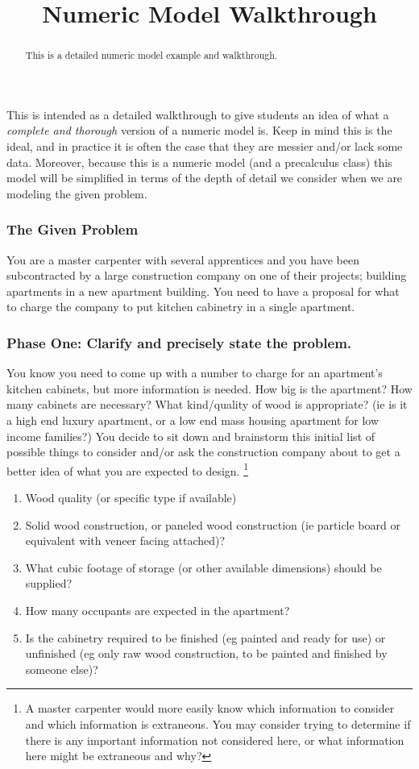 \documentclass{ximera}
\title{Numeric Model Walkthrough}
\begin{document}
\begin{abstract}
    This is a detailed numeric model example and walkthrough.
\end{abstract}
\maketitle


This is intended as a detailed walkthrough to give students an idea of what a \textit{complete and thorough} version of a numeric model is. Keep in mind this is the ideal, and in practice it is often the case that they are messier and/or lack some data. Moreover, because this is a numeric model (and a precalculus class) this model will be simplified in terms of the depth of detail we consider when we are modeling the given problem.

\subsubsection*{The Given Problem}
    You are a master carpenter with several apprentices and you have been subcontracted by a large construction company on one of their projects; building apartments in a new apartment building. You need to have a proposal for what to charge the company to put kitchen cabinetry in a single apartment.

\subsubsection*{Phase One: Clarify and precisely state the problem.}
    You know you need to come up with a number to charge for an apartment's kitchen cabinets, but more information is needed. How big is the apartment? How many cabinets are necessary? What kind/quality of wood is appropriate? (ie is it a high end luxury apartment, or a low end mass housing apartment for low income families?) You decide to sit down and brainstorm this initial list of possible things to consider and/or ask the construction company about to get a better idea of what you are expected to design.
    \footnote{A master carpenter would more easily know which information to consider and which information is extraneous. You may consider trying to determine if there is any important information not considered here, or what information here might be extraneous and why?}
    \begin{enumerate}
        \item Wood quality (or specific type if available)
        \item Solid wood construction, or paneled wood construction (ie particle board or equivalent with veneer facing attached)?
        \item What cubic footage of storage (or other available dimensions) should be supplied?
        \item How many occupants are expected in the apartment?
        \item Is the cabinetry required to be finished (eg painted and ready for use) or unfinished (eg only raw wood construction, to be painted and finished by someone else)?
    \end{enumerate}
    
\end{document}
